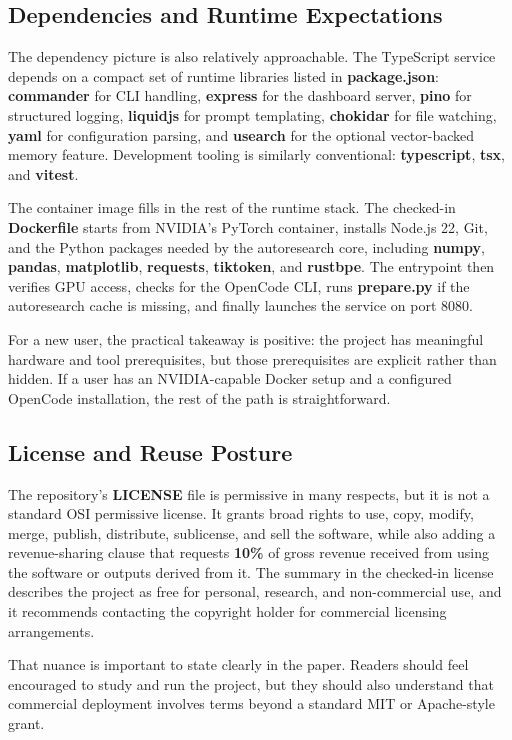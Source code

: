 \documentclass[conference]{IEEEtran}
\newcommand{\file}[1]{{\ttfamily\bfseries\textcolor{accentteal}{#1}}}
\newcommand{\metric}[1]{\textcolor{accentteal}{\textbf{#1}}}
\begin{document}
\subsection{Dependencies and Runtime Expectations}
The dependency picture is also relatively approachable. The TypeScript service depends on a compact set of runtime libraries listed in \file{package.json}: \file{commander} for CLI handling, \file{express} for the dashboard server, \file{pino} for structured logging, \file{liquidjs} for prompt templating, \file{chokidar} for file watching, \file{yaml} for configuration parsing, and \file{usearch} for the optional vector-backed memory feature. Development tooling is similarly conventional: \file{typescript}, \file{tsx}, and \file{vitest}.

The container image fills in the rest of the runtime stack. The checked-in \file{Dockerfile} starts from NVIDIA's PyTorch container, installs Node.js 22, Git, and the Python packages needed by the autoresearch core, including \file{numpy}, \file{pandas}, \file{matplotlib}, \file{requests}, \file{tiktoken}, and \file{rustbpe}. The entrypoint then verifies GPU access, checks for the OpenCode CLI, runs \file{prepare.py} if the autoresearch cache is missing, and finally launches the service on port 8080.

For a new user, the practical takeaway is positive: the project has meaningful hardware and tool prerequisites, but those prerequisites are explicit rather than hidden. If a user has an NVIDIA-capable Docker setup and a configured OpenCode installation, the rest of the path is straightforward.

\subsection{License and Reuse Posture}
The repository's \file{LICENSE} file is permissive in many respects, but it is not a standard OSI permissive license. It grants broad rights to use, copy, modify, merge, publish, distribute, sublicense, and sell the software, while also adding a revenue-sharing clause that requests \metric{10\%} of gross revenue received from using the software or outputs derived from it. The summary in the checked-in license describes the project as free for personal, research, and non-commercial use, and it recommends contacting the copyright holder for commercial licensing arrangements.

That nuance is important to state clearly in the paper. Readers should feel encouraged to study and run the project, but they should also understand that commercial deployment involves terms beyond a standard MIT or Apache-style grant.
\end{document}
